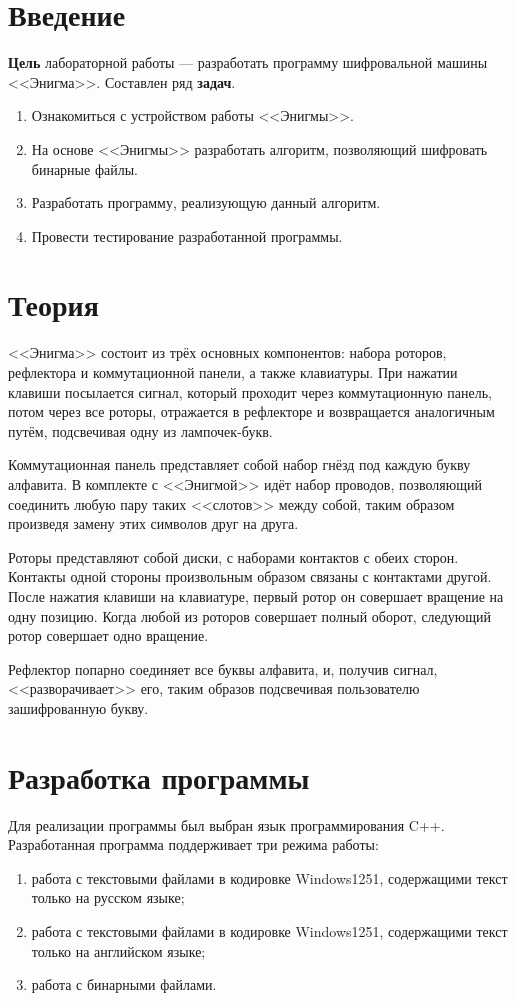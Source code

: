 \documentclass[14pt, oneside, a4paper]{extreport}
\begin{document}

\setcounter{page}{2}

\chapter{Введение}

\textbf{Цель} лабораторной работы --- разработать программу шифровальной машины <<Энигма>>.
Составлен ряд \textbf{задач}.
\begin{enumerate}
	\item Ознакомиться с устройством работы <<Энигмы>>.
	\item На основе <<Энигмы>> разработать алгоритм, позволяющий шифровать бинарные файлы.
	\item Разработать программу, реализующую данный алгоритм.
	\item Провести тестирование разработанной программы.
\end{enumerate}

\chapter{Теория}

<<Энигма>> состоит из трёх основных компонентов: набора роторов, рефлектора и коммутационной панели, а также клавиатуры. При нажатии клавиши посылается сигнал, который проходит через коммутационную панель, потом через все роторы, отражается в рефлекторе и возвращается аналогичным путём, подсвечивая одну из лампочек-букв.

Коммутационная панель представляет собой набор гнёзд под каждую букву алфавита. В комплекте с <<Энигмой>> идёт набор проводов, позволяющий соединить любую пару таких <<слотов>> между собой, таким образом произведя замену этих символов друг на друга.

Роторы представляют собой диски, с наборами контактов с обеих сторон. Контакты одной стороны произвольным образом связаны с контактами другой. После нажатия клавиши на клавиатуре, первый ротор он совершает вращение на одну позицию. Когда любой из роторов совершает полный оборот, следующий ротор совершает одно вращение.

Рефлектор попарно соединяет все буквы алфавита, и, получив сигнал, <<разворачивает>> его, таким образов подсвечивая пользователю зашифрованную букву.

\chapter{Разработка программы}
Для реализации программы был выбран язык программирования C++.
Разработанная программа поддерживает три режима работы:
\begin{enumerate}
	\item работа с текстовыми файлами в кодировке Windows1251, содержащими текст только на русском языке;
	\item работа с текстовыми файлами в кодировке Windows1251, содержащими текст только на английском языке;
	\item работа с бинарными файлами.
\end{enumerate}
\end{document}
